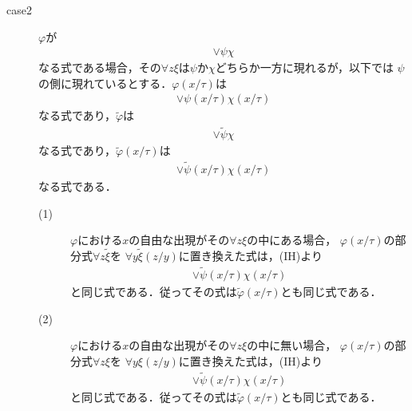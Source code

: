 \begin{metaprf}
\begin{description}
\begin{description}
					\item[case2] $\varphi$が
						\begin{align}
							\vee \psi \chi
						\end{align}
						なる式である場合，その$\forall z \xi$は$\psi$か$\chi$どちらか一方に現れるが，以下では
						$\psi$の側に現れているとする．$\varphi(x/\tau)$は
						\begin{align}
							\vee \psi(x/\tau) \chi(x/\tau)
						\end{align}
						なる式であり，$\widetilde{\varphi}$は
						\begin{align}
							\vee \widetilde{\psi} \chi
						\end{align}
						なる式であり，$\widetilde{\varphi}(x/\tau)$は
						\begin{align}
							\vee \widetilde{\psi}(x/\tau) \chi(x/\tau)
						\end{align}
						なる式である．
						\begin{description}
							\item[(1)] $\varphi$における$x$の自由な出現がその$\forall z \xi$の中にある場合，
								$\varphi(x/\tau)$の部分式$\forall z \widetilde{\xi}$を
								$\forall y \widetilde{\xi}(z/y)$に置き換えた式は，(IH)より
								\begin{align}
									\vee \widetilde{\psi}(x/\tau) \chi(x/\tau)
								\end{align}
								と同じ式である．従ってその式は$\widetilde{\varphi}(x/\tau)$とも同じ式である．
								
							\item[(2)] $\varphi$における$x$の自由な出現がその$\forall z \xi$の中に無い場合，
								$\varphi(x/\tau)$の部分式$\forall z \xi$を
								$\forall y \xi(z/y)$に置き換えた式は，(IH)より
								\begin{align}
									\vee \widetilde{\psi}(x/\tau) \chi(x/\tau)
								\end{align}
								と同じ式である．従ってその式は$\widetilde{\varphi}(x/\tau)$とも同じ式である．
						\end{description}
						

\end{description}
\end{description}
\end{metaprf}
